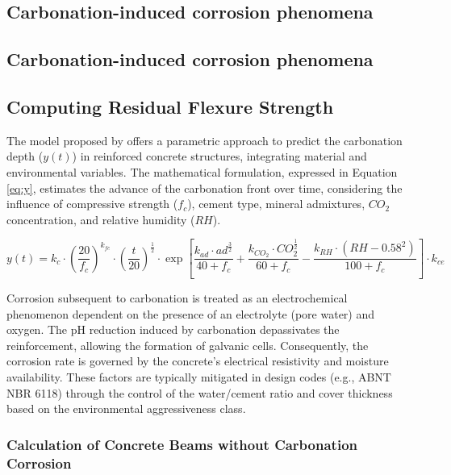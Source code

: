 \subsection{Carbonation-induced corrosion phenomena}

\subsection{Carbonation-induced corrosion phenomena}

\subsection{Computing Residual Flexure Strength}

The model proposed by \cite{possan2010} offers a parametric approach to predict the carbonation depth ($y(t)$) in reinforced concrete structures, integrating material and environmental variables. The mathematical formulation, expressed in Equation \eqref{eq:y}, estimates the advance of the carbonation front over time, considering the influence of compressive strength ($f_c$), cement type, mineral admixtures, $CO_2$ concentration, and relative humidity ($RH$).

\begin{equation}\label{eq:y}
y(t) = k_c \cdot \left( \frac{20}{f_c} \right)^{k_{fc}} \cdot \left( \frac{t}{20} \right)^{\frac{1}{2}} \cdot \exp \left[ \frac{k_{ad} \cdot ad^{\frac{3}{2}}}{40 + f_c} + \frac{k_{CO_2} \cdot CO_2^{\frac{1}{2}}}{60 + f_c} - \frac{k_{RH} \cdot (RH - 0.58^2)}{100 + f_c} \right] \cdot k_{ce}
\end{equation}

Corrosion subsequent to carbonation is treated as an electrochemical phenomenon dependent on the presence of an electrolyte (pore water) and oxygen. The pH reduction induced by carbonation depassivates the reinforcement, allowing the formation of galvanic cells. Consequently, the corrosion rate is governed by the concrete's electrical resistivity and moisture availability. These factors are typically mitigated in design codes (e.g., ABNT NBR 6118) through the control of the water/cement ratio and cover thickness based on the environmental aggressiveness class.

\subsubsection{Calculation of Concrete Beams without Carbonation Corrosion}

